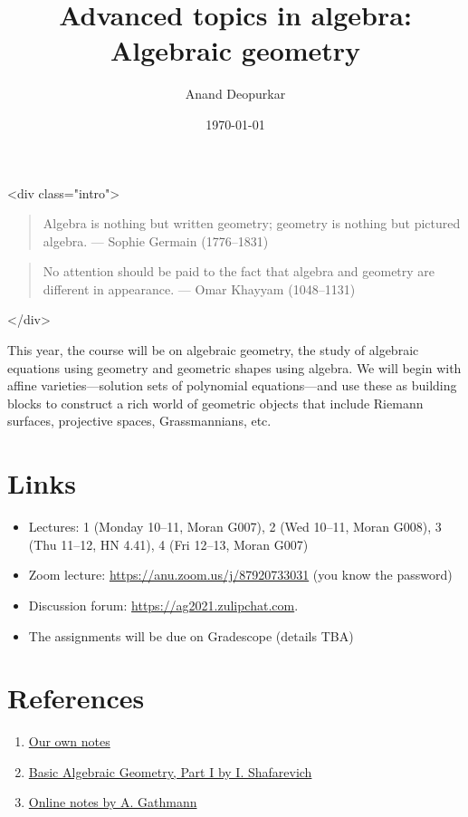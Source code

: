 \documentclass[11pt]{article}
\author{Anand Deopurkar}
\date{\today}
\title{Advanced topics in algebra: Algebraic geometry}
\begin{document}
\maketitle
<div class="intro">
\begin{quote}
Algebra is nothing but written geometry; geometry is nothing but pictured algebra.  
--- Sophie Germain (1776--1831)
\end{quote}
\begin{quote}
No attention should be paid to the fact that algebra and geometry are different in appearance.  
--- Omar Khayyam (1048--1131)
\end{quote}
</div>

This year, the course will be on algebraic geometry, the study of algebraic equations using geometry and geometric shapes using algebra.
We will begin with affine varieties---solution sets of polynomial equations---and use these as building blocks to construct a rich world of geometric objects that include Riemann surfaces, projective spaces, Grassmannians, etc.

\section{Links}
\label{sec:orgffde729}
\begin{itemize}
\item Lectures: 1 (Monday 10--11, Moran G007), 2 (Wed 10--11, Moran G008), 3 (Thu 11--12, HN 4.41), 4 (Fri 12--13, Moran G007)
\item Zoom lecture: \url{https://anu.zoom.us/j/87920733031} (you know the password)
\item Discussion forum: \url{https://ag2021.zulipchat.com}.
\item The assignments will be due on Gradescope (details TBA)
\end{itemize}

\section{References}
\label{sec:orgbb80143}
\begin{enumerate}
\item \href{notes}{Our own notes}
\item \href{https://link.springer.com/book/10.1007/978-3-642-37956-7}{Basic Algebraic Geometry, Part I by I. Shafarevich}
\item \href{https://www.mathematik.uni-kl.de/\~gathmann/class/alggeom-2002/alggeom-2002.pdf}{Online notes by A. Gathmann}
\end{enumerate}
\end{document}
